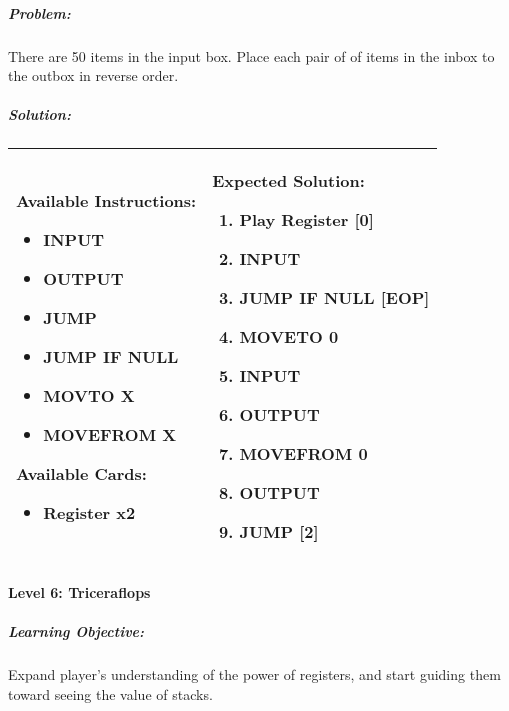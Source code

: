 \subparagraph{Problem:} There are 50 items in the input box. Place each pair of of items in the inbox to the outbox in reverse order.

\subparagraph{Solution:} 
\begin{center}
    \begin{tabular}{ | m{5cm} | m{9cm} | } 
        \hline
            \textbf{Available Instructions:} 
            \begin{itemize}
                \item INPUT
                \item OUTPUT
                \item JUMP
                \item JUMP IF NULL
                \item MOVTO X
                \item MOVEFROM X
            \end{itemize}
            \textbf{Available Cards:} 
            \begin{itemize}
                \item Register x2
            \end{itemize}& 
            \textbf{Expected Solution:} 
            \begin{enumerate}
                \item Play Register [0]
                \item INPUT
                \item JUMP IF NULL [EOP]
                \item MOVETO 0
                \item INPUT
                \item OUTPUT
                \item MOVEFROM 0 
                \item OUTPUT
                \item JUMP [2]
            \end{enumerate}
            \\
        \hline
    \end{tabular}
\end{center}

\paragraph{Level 6: Triceraflops}
\subparagraph{Learning Objective:} Expand player's understanding of the power of registers, and start guiding them toward seeing the value of stacks.

